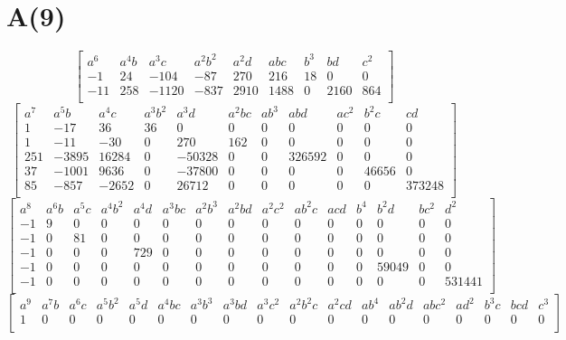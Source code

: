 \documentclass[10pt]{amsart}
\begin{document}
\section*{A(9)}
\[ \begin{bmatrix}
a^{6} & a^{4}b & a^{3}c & a^{2}b^{2} & a^{2}d & abc & b^{3} & bd & c^{2} \\
-1 & 24 & -104 & -87 & 270 & 216 & 18 & 0 & 0 \\
-11 & 258 & -1120 & -837 & 2910 & 1488 & 0 & 2160 & 864 \\
\end{bmatrix} \]
\[ \begin{bmatrix}
a^{7} & a^{5}b & a^{4}c & a^{3}b^{2} & a^{3}d & a^{2}bc & ab^{3} & abd & ac^{2} & b^{2}c & cd \\
1 & -17 & 36 & 36 & 0 & 0 & 0 & 0 & 0 & 0 & 0 \\
1 & -11 & -30 & 0 & 270 & 162 & 0 & 0 & 0 & 0 & 0 \\
251 & -3895 & 16284 & 0 & -50328 & 0 & 0 & 326592 & 0 & 0 & 0 \\
37 & -1001 & 9636 & 0 & -37800 & 0 & 0 & 0 & 0 & 46656 & 0 \\
85 & -857 & -2652 & 0 & 26712 & 0 & 0 & 0 & 0 & 0 & 373248 \\
\end{bmatrix} \]
\[ \begin{bmatrix}
a^{8} & a^{6}b & a^{5}c & a^{4}b^{2} & a^{4}d & a^{3}bc & a^{2}b^{3} & a^{2}bd & a^{2}c^{2} & ab^{2}c & acd & b^{4} & b^{2}d & bc^{2} & d^{2} \\
-1 & 9 & 0 & 0 & 0 & 0 & 0 & 0 & 0 & 0 & 0 & 0 & 0 & 0 & 0 \\
-1 & 0 & 81 & 0 & 0 & 0 & 0 & 0 & 0 & 0 & 0 & 0 & 0 & 0 & 0 \\
-1 & 0 & 0 & 0 & 729 & 0 & 0 & 0 & 0 & 0 & 0 & 0 & 0 & 0 & 0 \\
-1 & 0 & 0 & 0 & 0 & 0 & 0 & 0 & 0 & 0 & 0 & 0 & 59049 & 0 & 0 \\
-1 & 0 & 0 & 0 & 0 & 0 & 0 & 0 & 0 & 0 & 0 & 0 & 0 & 0 & 531441 \\
\end{bmatrix} \]
\[ \begin{bmatrix}
a^{9} & a^{7}b & a^{6}c & a^{5}b^{2} & a^{5}d & a^{4}bc & a^{3}b^{3} & a^{3}bd & a^{3}c^{2} & a^{2}b^{2}c & a^{2}cd & ab^{4} & ab^{2}d & abc^{2} & ad^{2} & b^{3}c & bcd & c^{3} \\
1 & 0 & 0 & 0 & 0 & 0 & 0 & 0 & 0 & 0 & 0 & 0 & 0 & 0 & 0 & 0 & 0 & 0 \\
\end{bmatrix} \]
\end{document}

